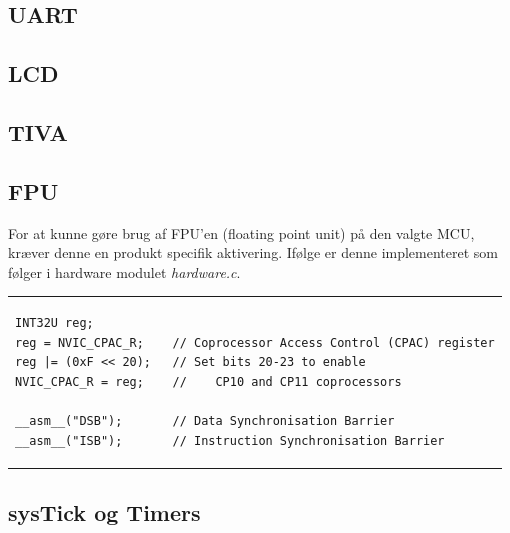 \subsection{UART}\label{subsec:uart}

\subsection{LCD}
\subsection{TIVA}

\subsection{FPU}
For at kunne gøre brug af FPU'en (floating point unit) på den valgte MCU, kræver denne en produkt specifik aktivering.
Ifølge \cite[afsnit 3.1.5.7 s. 132]{tm4c123gh6pm} er denne implementeret som følger i hardware modulet \textit{hardware.c}.

\begin{tabular}{l}
\begin{lstlisting}[title=init\_FPU()]
INT32U reg;
reg = NVIC_CPAC_R;    // Coprocessor Access Control (CPAC) register
reg |= (0xF << 20);   // Set bits 20-23 to enable 
NVIC_CPAC_R = reg;    // 	CP10 and CP11 coprocessors

__asm__("DSB");       // Data Synchronisation Barrier
__asm__("ISB");       // Instruction Synchronisation Barrier
\end{lstlisting}
\end{tabular}

\subsection{sysTick og Timers}


